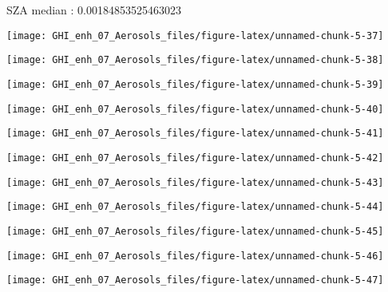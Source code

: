 \documentclass[
  10pt,
  a4paper,oneside]{article}
\begin{document}
SZA median : 0.00184853525463023

\begin{center}\texttt{[image: GHI\_enh\_07\_Aerosols\_files/figure-latex/unnamed-chunk-5-37]} \end{center}

\begin{center}\texttt{[image: GHI\_enh\_07\_Aerosols\_files/figure-latex/unnamed-chunk-5-38]} \end{center}

\begin{center}\texttt{[image: GHI\_enh\_07\_Aerosols\_files/figure-latex/unnamed-chunk-5-39]} \end{center}

\begin{center}\texttt{[image: GHI\_enh\_07\_Aerosols\_files/figure-latex/unnamed-chunk-5-40]} \end{center}

\begin{center}\texttt{[image: GHI\_enh\_07\_Aerosols\_files/figure-latex/unnamed-chunk-5-41]} \end{center}

\begin{center}\texttt{[image: GHI\_enh\_07\_Aerosols\_files/figure-latex/unnamed-chunk-5-42]} \end{center}

\begin{center}\texttt{[image: GHI\_enh\_07\_Aerosols\_files/figure-latex/unnamed-chunk-5-43]} \end{center}

\begin{center}\texttt{[image: GHI\_enh\_07\_Aerosols\_files/figure-latex/unnamed-chunk-5-44]} \end{center}

\begin{center}\texttt{[image: GHI\_enh\_07\_Aerosols\_files/figure-latex/unnamed-chunk-5-45]} \end{center}

\begin{center}\texttt{[image: GHI\_enh\_07\_Aerosols\_files/figure-latex/unnamed-chunk-5-46]} \end{center}

\begin{center}\texttt{[image: GHI\_enh\_07\_Aerosols\_files/figure-latex/unnamed-chunk-5-47]} \end{center}
\end{document}
